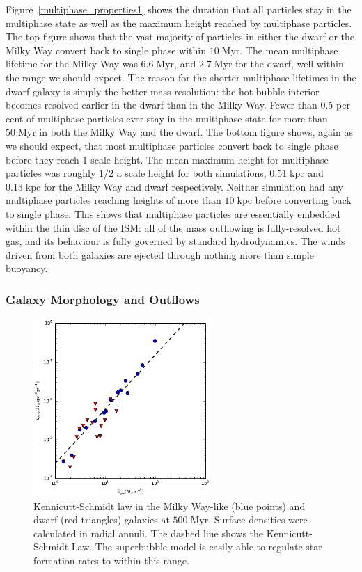 Figure~\ref{multiphase_properties1} shows the duration that all particles stay in
the multiphase state as well as the maximum height reached by multiphase
particles.  The top figure shows that the vast majority of particles in either
the dwarf or the Milky Way convert back to single phase within
$10\;\mathrm{Myr}$.  The mean multiphase lifetime for the Milky Way was
$6.6\;\mathrm{Myr}$, and $2.7\;\mathrm{Myr}$ for the dwarf, well within the
range we should expect.  The reason for the shorter multiphase lifetimes in the
dwarf galaxy is simply the better mass resolution: the hot bubble interior
becomes resolved earlier in the dwarf than in the Milky Way.  Fewer than 0.5 per
cent of multiphase particles ever stay in the multiphase state for more than
$50\;\mathrm{Myr}$ in both the Milky Way and the dwarf.  The bottom figure
shows, again as we should expect, that most multiphase particles convert back to
single phase before they reach 1 scale height.  The mean maximum height for
multiphase particles was roughly $1/2$ a scale height for both simulations,
$0.51\;\mathrm{kpc}$ and $0.13\;\mathrm{kpc}$ for the Milky Way and dwarf
respectively.  Neither simulation had any multiphase particles reaching heights
of more than $10\;\mathrm{kpc}$ before converting back to single phase.  This
shows that multiphase particles are essentially embedded within the thin disc of
the ISM: all of the mass outflowing is fully-resolved hot gas, and its behaviour
is fully governed by standard hydrodynamics.  The winds driven from both
galaxies are ejected through nothing more than simple buoyancy.

\subsubsection{Galaxy Morphology and Outflows}\label{Morphology1}

\begin{figure}
    \includegraphics[width=0.6\textwidth]{figures1/kennicutt_schmidt.eps}
    \caption[Kennicutt-Schmidt law for isolated galaxies]{Kennicutt-Schmidt law
    in the Milky Way-like (blue points) and dwarf (red triangles) galaxies at
    $500\;\mathrm{Myr}$. Surface densities were calculated in radial annuli.
    The dashed line shows the Kennicutt-Schmidt Law.  The superbubble model is
    easily able to regulate star formation rates to within this range.}
    \label{kennicutt_schmidt1}
\end{figure}

